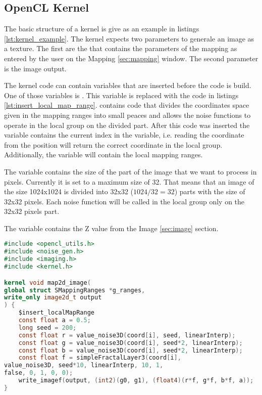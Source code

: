 \subsection{OpenCL Kernel}

The basic structure of a kernel is give as an example in listings \ref{lst:kernel_example}.
The kernel expects two parameters to generale an image as a texture. The first
are the  that contains the parameters of the mapping
as entered by the user on the Mapping \ref{sec:mapping} window. The second parameter
is the  image output.

The kernel code can contain variables that are inserted before the code is build.
One of those variables is . This variable
is replaced with the code in listings \ref{lst:insert_local_map_range}.
 contains code that divides the coordinates
space given in the mapping ranges into small peaces and allows the noise functions
to operate in the local group on the divided part. After this code was inserted 
the  variable contains the current index in the 
variable, i.e. reading the coordinate from the position  will return
the correct coordinate in the local group. Additionally, the variable
 will contain the local mapping ranges.

The variable  contains the size of the part of the
image that we want to process in pixels. Currently it is set to a maximum size of 32.
That means that an image of the size 1024x1024 is divided into 32x32 ($1024/32=32$) parts
with the size of 32x32 pixels. Each noise function will be called in the local group
only on the 32x32 pixels part.

The variable  contains the Z value from the Image \ref{sec:image} section.

\begin{lstlisting}[caption={Kernel Example},label={lst:kernel_example},language=OpenCL]
#include <opencl_utils.h>
#include <noise_gen.h>
#include <imaging.h>
#include <kernel.h>

kernel void map2d_image(
global struct SMappingRanges *g_ranges,
write_only image2d_t output
) {
    $insert_localMapRange
    const float a = 0.5;
    long seed = 200;
    const float r = value_noise3D(coord[i], seed, linearInterp);
    const float g = value_noise3D(coord[i], seed*2, linearInterp);
    const float b = value_noise3D(coord[i], seed*2, linearInterp);
    const float f = simpleFractalLayer3(coord[i], 
value_noise3D, seed*10, linearInterp, 10, 1, 
false, 0, 1, 0, 0);
    write_imagef(output, (int2)(g0, g1), (float4)(r*f, g*f, b*f, a));
}
\end{lstlisting}

